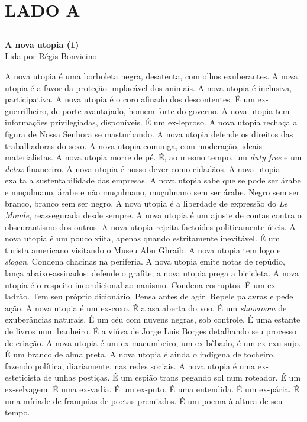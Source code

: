 \part{LADO A}

\chapter*{}
\textbf{A nova utopia (1)}\\
Lida por Régis Bonvicino

A nova utopia é uma borboleta negra, desatenta, com olhos exuberantes. A
nova utopia é a favor da proteção implacável dos animais. A nova utopia
é inclusiva, participativa. A nova utopia é o coro afinado dos
descontentes. É um ex-guerrilheiro, de porte avantajado, homem forte do
governo. A nova utopia tem informações privilegiadas, disponíveis. É um
ex-leproso. A nova utopia rechaça a figura de Nossa Senhora se
masturbando. A nova utopia defende os direitos das trabalhadoras do
sexo. A nova utopia comunga, com moderação, ideais materialistas. A nova
utopia morre de pé. É, ao mesmo tempo, um \emph{duty free} e um
\emph{detox} financeiro. A nova utopia é nosso dever como cidadãos. A
nova utopia exalta a sustentabilidade das empresas. A nova utopia sabe
que se pode ser árabe e muçulmano, árabe e não muçulmano, muçulmano sem
ser árabe. Negro sem ser branco, branco sem ser negro. A nova utopia é a
liberdade de expressão do \emph{Le Monde}, reassegurada desde sempre. A
nova utopia é um ajuste de contas contra o obscurantismo dos outros. A
nova utopia rejeita factoides politicamente úteis. A nova utopia é um
pouco xiita, apenas quando estritamente inevitável. É um turista
americano visitando o Museu Abu Ghraib. A nova utopia tem logo e
\emph{slogan}. Condena chacinas na periferia. A nova utopia emite notas
de repúdio, lança abaixo-assinados; defende o grafite; a nova utopia
prega a bicicleta. A nova utopia é o respeito incondicional ao nanismo.
Condena corruptos. É um ex-ladrão. Tem seu próprio dicionário. Pensa
antes de agir. Repele palavras e pede ação. A nova utopia é um ex-coxo.
É a asa aberta do voo. É um \emph{showroom} de exuberâncias naturais. É
um céu com nuvens negras, sob controle. É uma estante de livros num
banheiro. É a viúva de Jorge Luis Borges detalhando seu processo de
criação. A nova utopia é um ex-macumbeiro, um ex-bêbado, é um ex-exu
sujo. É um branco de alma preta. A nova utopia é ainda o indígena de
tocheiro, fazendo política, diariamente, nas redes sociais. A nova
utopia é uma ex-esteticista de unhas postiças. É um espião trans pegando
sol num roteador. É um ex-selvagem. É uma ex-vadia. É um ex-puto. É uma
entendida. É um ex-pária. É uma míriade de franquias de poetas
premiados. É um poema à altura de seu tempo.

